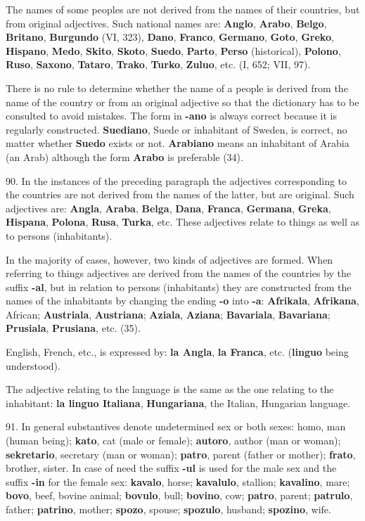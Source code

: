The names of some peoples are not derived from the names of their countries, but from original adjectives. Such national names are: \textbf{Anglo}, \textbf{Arabo}, \textbf{Belgo}, \textbf{Britano}, \textbf{Burgundo} (VI, 323), \textbf{Dano}, \textbf{Franco}, \textbf{Germano}, \textbf{Goto}, \textbf{Greko}, \textbf{Hispano}, \textbf{Medo}, \textbf{Skito}, \textbf{Skoto}, \textbf{Suedo}, \textbf{Parto}, \textbf{Perso} (historical), \textbf{Polono}, \textbf{Ruso}, \textbf{Saxono}, \textbf{Tataro}, \textbf{Trako}, \textbf{Turko}, \textbf{Zuluo}, etc. (I, 652; VII, 97). 

There is no rule to determine whether the name of a people is derived from the name of the country or from an original adjective so that the dictionary has to be consulted to avoid mistakes. The form in \textbf{-ano} is always correct because it is regularly constructed. \textbf{Suediano}, Suede or inhabitant of Sweden, is correct, no matter whether \textbf{Suedo} exists or not. \textbf{Arabiano} means an inhabitant of Arabia (an Arab) although the form \textbf{Arabo} is preferable (34). 

90. In the instances of the preceding paragraph the adjectives corresponding to the countries are not derived from the names of the latter, but are original. Such adjectives are: \textbf{Angla}, \textbf{Araba}, \textbf{Belga}, \textbf{Dana}, \textbf{Franca}, \textbf{Germana}, \textbf{Greka}, \textbf{Hispana}, \textbf{Polona}, \textbf{Rusa}, \textbf{Turka}, etc. These adjectives relate to things as well as to persons (inhabitants). 

In the majority of cases, however, two kinds of adjectives are formed. When referring to things adjectives are derived from the names of the countries by the suffix \textbf{-al}, but in relation to persons (inhabitants) they are constructed from the names of the inhabitants by changing the ending \textbf{-o} into \textbf{-a}: \textbf{Afrikala}, \textbf{Afrikana}, African; \textbf{Austriala}, \textbf{Austriana}; \textbf{Aziala}, \textbf{Aziana}; \textbf{Bavariala}, \textbf{Bavariana}; \textbf{Prusiala}, \textbf{Prusiana}, etc. (35). 

English, French, etc., is expressed by: \textbf{la Angla}, \textbf{la Franca}, etc. (\textbf{linguo} being understood). 

The adjective relating to the language is the same as the one relating to the inhabitant: \textbf{la linguo Italiana}, \textbf{Hungariana}, the Italian, Hungarian language. 

91. In general substantives denote undetermined sex or both sexes: homo, man (human being); \textbf{kato}, cat (male or female); \textbf{autoro}, author (man or woman); \textbf{sekretario}, secretary (man or woman); \textbf{patro}, parent (father or mother); \textbf{frato}, brother, sister. In case of need the suffix \textbf{-ul} is used for the male sex and the suffix \textbf{-in} for the female sex: \textbf{kavalo}, horse; \textbf{kavalulo}, stallion; \textbf{kavalino}, mare; \textbf{bovo}, beef, bovine animal; \textbf{bovulo}, bull; \textbf{bovino}, cow; \textbf{patro}, parent; \textbf{patrulo}, father; \textbf{patrino}, mother; \textbf{spozo}, spouse; \textbf{spozulo}, husband; \textbf{spozino}, wife. 

